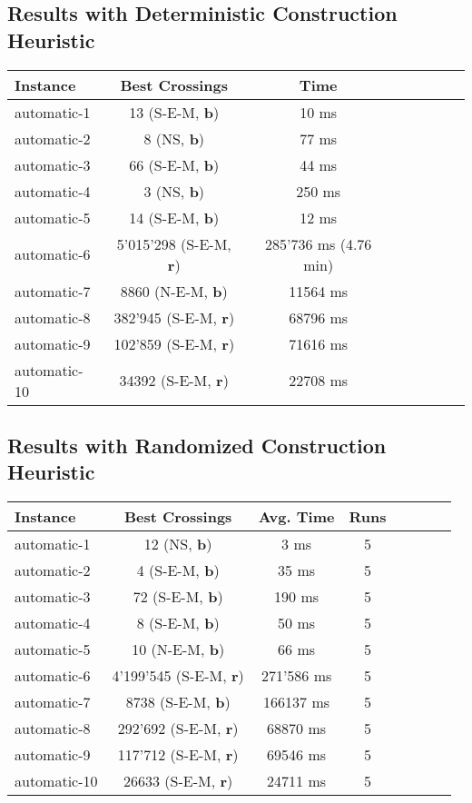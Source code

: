 \documentclass[11pt]{article}
\begin{document}
\subsection{Results with Deterministic Construction Heuristic}


\begin{tabular}{l*{6}{c}r}
	Instance & Best Crossings & Time \\
	\hline
	automatic-1 & 13 (S-E-M, \textbf{b}) & 10 ms \\
	automatic-2 & 8 (NS, \textbf{b}) & 77 ms \\
	automatic-3 & 66 (S-E-M, \textbf{b}) & 44 ms \\
	automatic-4 & 3 (NS, \textbf{b}) & 250 ms \\
	automatic-5 & 14 (S-E-M, \textbf{b}) & 12 ms \\
	automatic-6 & 5'015'298 (S-E-M, \textbf{r}) & 285'736 ms (4.76 min) \\
	automatic-7 & 8860 (N-E-M, \textbf{b}) & 11564 ms \\
	automatic-8 & 382'945 (S-E-M, \textbf{r}) & 68796 ms  \\
	automatic-9 & 102'859 (S-E-M, \textbf{r}) & 71616 ms \\
	automatic-10 & 34392 (S-E-M, \textbf{r}) & 22708 ms  \\
\end{tabular}



\subsection{Results with Randomized Construction Heuristic}

\begin{tabular}{l*{6}{c}r}
Instance & Best Crossings & Avg. Time & Runs\\
\hline
automatic-1 & 12 (NS, \textbf{b}) & 3 ms & 5 \\
automatic-2 & 4 (S-E-M, \textbf{b}) & 35 ms & 5 \\
automatic-3 & 72 (S-E-M, \textbf{b}) & 190 ms & 5 \\
automatic-4 & 8 (S-E-M, \textbf{b}) & 50 ms & 5 \\
automatic-5 & 10 (N-E-M, \textbf{b}) & 66 ms & 5 \\
automatic-6 & 4'199'545 (S-E-M, \textbf{r}) & 271'586 ms & 5 \\
automatic-7 & 8738 (S-E-M, \textbf{b}) & 166137 ms & 5 \\
automatic-8 & 292'692 (S-E-M, \textbf{r}) & 68870 ms  & 5 \\
automatic-9 & 117'712 (S-E-M, \textbf{r}) & 69546 ms & 5 \\
automatic-10 & 26633 (S-E-M, \textbf{r}) & 24711 ms  & 5 \\
\end{tabular}
\newline
\newline
\end{document}
